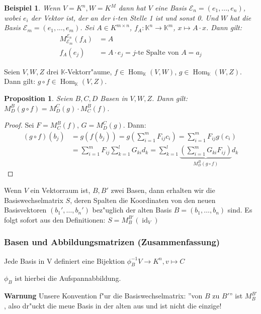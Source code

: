 \documentclass[11pt]{article}
\DeclareMathOperator{\mHom}{Hom}
\DeclareMathOperator{\mId}{id}
\newtheorem{exa}{Beispiel}[section]
\newtheorem*{proposition}{Proposition}
\begin{document}
\begin{exa}
Wenn \(V=K^n, W=K^M\) dann hat \(V\) eine Basis \(\mathcal{E}_n = (e_1, \dots, e_n)\), wobei \(e_i\) der Vektor ist, der an der \(i\)-ten Stelle 1 ist und sonst 0. Und \(W\) hat die Basis \(\mathcal{E}_m = (e_1, \dots, e_m)\).
Sei \(A\in K^{m\times n }\), \(f_A: \mathbb{K}^n\to \mathbb{K}^m\), \(x \mapsto A\cdot x\). Dann gilt:
\begin{align*}
M^{\mathcal{E}_n}_{\mathcal{E}_m}(f_A) &= A\\
f_A(e_j) &= A\cdot e_j = j\text{-te Spalte von } A = a_j
\end{align*}
\end{exa}

Seien \(V, W, Z\) drei \(\mathbb{K}\)-Vektorr"aume, \(f \in \mHom_\mathbb{K}(V, W)\), \(g \in \mHom_\mathbb{K}(W,Z)\). Dann gilt: \(g\circ f \in \mHom_\mathbb{K}(V,Z)\).

\begin{proposition}
	 Seien \(B,C,D\) Basen in
	\(V,W,Z\). Dann gilt: \(M^B_D(g\circ f) = M^C_D(g)\cdot M^B_C(f)\).
\end{proposition}
\begin{proof}
 Sei \(F = M^B_C(f)\), \(G = M^C_D(g)\). Dann:
 \begin{align*}
 (g\circ f)(b_j) &= g(f(b_j)) = g\left(\sum_{i=1}^m F_{ij}c_i\right) = \sum_{i=1}^mF_{ij}g(c_i) \\&= \sum_{i=1}^m F_{ij}\sum_{k=1}^lG_{ki}d_k = \sum_{k=1}^l\underbrace{\left(\sum_{i=1}^mG_{ki}F_{ij}\right)}_{M^B_D(g\circ f)}d_k
 \end{align*}
\end{proof}

Wenn \(V\) ein Vektorraum ist, \(B,B'\) zwei Basen, dann erhalten wir die
 Basiswechselmatrix \(S\), deren Spalten die Koordinaten von den neuen
 Basisvektoren \((b_1', \dots, b_n')\) bez"uglich der alten Basis \(B = (b_1,
 \dots, b_n)\) sind. Es folgt sofort aus den Definitionen:
 \(S=M^{B'}_B(\mId_V)\)


\subsubsection{Basen und Abbildungsmatrizen (Zusammenfassung)}
\label{sec:baab}
Jede Basis in V definiert eine Bijektion $\phi_B^{-1}V\rightarrow K^n, v\mapsto C$
\begin{relation}
  $\phi_B$ ist hierbei die Aufspannabbildung.  
\end{relation}

\textbf{Warnung} Unsere Konvention f"ur die Basiswechselmatrix: ''von $B$ zu
$B'$'' ist $M^{B'}_B$, also dr"uckt die meue Basis in der alten aus und ist
nicht die einzige!
\end{document}
